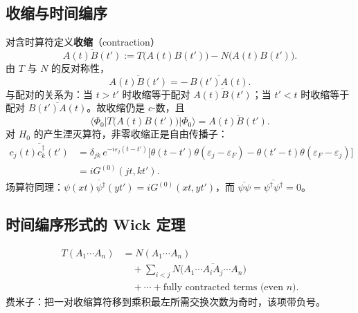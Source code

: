 \subsection{收缩与时间编序}

对含时算符定义\textbf{收缩}（contraction）
\begin{equation}
  \overline{A(t)B(t')}
  :=
  T\bigl(A(t)B(t')\bigr)
  -N\bigl(A(t)B(t')\bigr).
\label{eq:contraction}
\end{equation}
由 $T$ 与 $N$ 的反对称性，
\begin{equation}
  \overline{A(t)B(t')}
  =-\,\overline{B(t')A(t)}.
\end{equation}
与配对的关系为：当 $t>t'$ 时收缩等于配对 $\overline{A(t)B(t')}$；当 $t'<t$ 时收缩等于配对 $\overline{B(t')A(t)}$。故收缩仍是 $c$-数，且
\begin{equation}
  \langle\Phi_0|T\bigl(A(t)B(t')\bigr)|\Phi_0\rangle
  =\overline{A(t)B(t')}.
\end{equation}
对 $H_0$ 的产生湮灭算符，非零收缩正是自由传播子：
\begin{equation}
\begin{aligned}
  \overline{c_j(t)c_k^\dagger(t')}
  &=\delta_{jk}\,e^{-i\varepsilon_j(t-t')}
  \bigl[
  \theta(t-t')\theta(\varepsilon_j-\varepsilon_F)
  -\theta(t'-t)\theta(\varepsilon_F-\varepsilon_j)
  \bigr]\\
  &=i G^{(0)}(j t,k t').
\end{aligned}
\label{eq:contr_G0}
\end{equation}
场算符同理：$\overline{\psi(xt)\psi^\dagger(yt')}=iG^{(0)}(xt,yt')$，而
$\overline{\psi\psi}=\overline{\psi^\dagger\psi^\dagger}=0$。

\subsection{时间编序形式的 Wick 定理}

\begin{theorem}[Wick，$T$ 乘积]
\begin{equation}
\begin{aligned}
  T(A_1\cdots A_n)
  &=N(A_1\cdots A_n)\\
  &\quad+\sum_{i<j}
  N\bigl(A_1\cdots\overline{A_i A_j}\cdots A_n\bigr)\\
  &\quad+\cdots
  +\text{fully contracted terms (even $n$)}.
\end{aligned}
\label{eq:wick_T}
\end{equation}
费米子：把一对收缩算符移到乘积最左所需交换次数为奇时，该项带负号。
\end{theorem}

